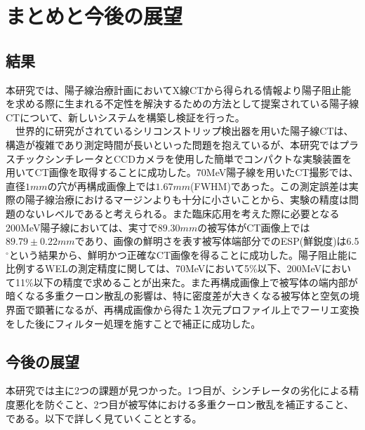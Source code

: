 \chapter{まとめと今後の展望}
\section{結果}
本研究では、陽子線治療計画においてX線CTから得られる情報より陽子阻止能を求める際に生まれる不定性を解決するための方法として提案されている陽子線CTについて、新しいシステムを構築し検証を行った。\\
　世界的に研究がされているシリコンストリップ検出器を用いた陽子線CTは、構造が複雑であり測定時間が長いといった問題を抱えているが、本研究ではプラスチックシンチレータとCCDカメラを使用した簡単でコンパクトな実験装置を用いてCT画像を取得することに成功した。70MeV陽子線を用いたCT撮影では、直径$1mm$の穴が再構成画像上では$1.67mm$(FWHM)であった。この測定誤差は実際の陽子線治療におけるマージンよりも十分に小さいことから、実験の精度は問題のないレベルであると考えられる。また臨床応用を考えた際に必要となる200MeV陽子線においては、実寸で$89.30mm$の被写体がCT画像上では$89.79 \pm 0.22mm$であり、画像の鮮明さを表す被写体端部分でのESP(鮮鋭度)は6.5$^\circ$という結果から、鮮明かつ正確なCT画像を得ることに成功した。陽子阻止能に比例するWELの測定精度に関しては、70MeVにおいて5\%以下、200MeVにおいて11\%以下の精度で求めることが出来た。また再構成画像上で被写体の端内部が暗くなる多重クーロン散乱の影響は、特に密度差が大きくなる被写体と空気の境界面で顕著になるが、再構成画像から得た１次元プロファイル上でフーリエ変換をした後にフィルター処理を施すことで補正に成功した。

\section{今後の展望}
本研究では主に2つの課題が見つかった。1つ目が、シンチレータの劣化による精度悪化を防ぐこと、2つ目が被写体における多重クーロン散乱を補正すること、である。以下で詳しく見ていくこととする。

